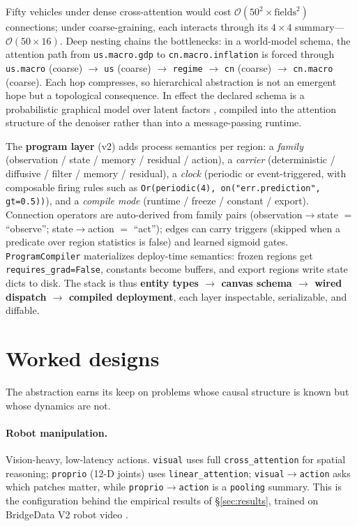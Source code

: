 \documentclass[10pt,twocolumn]{article}
\newcommand{\code}[1]{\texttt{\small #1}}
\begin{document}
Fifty vehicles under dense cross-attention would cost $\mathcal{O}(50^2\!\times\!\text{fields}^2)$ connections; under coarse-graining, each interacts through its $4\times4$ summary---$\mathcal{O}(50\times16)$. Deep nesting chains the bottlenecks: in a world-model schema, the attention path from \code{us.macro.gdp} to \code{cn.macro.inflation} is forced through \code{us.macro} (coarse) $\rightarrow$ \code{us} (coarse) $\rightarrow$ \code{regime} $\rightarrow$ \code{cn} (coarse) $\rightarrow$ \code{cn.macro} (coarse). Each hop compresses, so hierarchical abstraction is not an emergent hope but a topological consequence. In effect the declared schema is a probabilistic graphical model over latent factors \cite{koller2009pgm,pearl2009causality}, compiled into the attention structure of the denoiser rather than into a message-passing runtime.

The \textbf{program layer} (v2) adds process semantics per region: a \emph{family} (observation / state / memory / residual / action), a \emph{carrier} (deterministic / diffusive / filter / memory / residual), a \emph{clock} (periodic or event-triggered, with composable firing rules such as \code{Or(periodic(4), on("err.prediction", gt=0.5))}), and a \emph{compile mode} (runtime / freeze / constant / export). Connection operators are auto-derived from family pairs (observation$\rightarrow$state $=$ ``observe''; state$\rightarrow$action $=$ ``act''); edges can carry triggers (skipped when a predicate over region statistics is false) and learned sigmoid gates. \code{ProgramCompiler} materializes deploy-time semantics: frozen regions get \code{requires\_grad=False}, constants become buffers, and export regions write state dicts to disk. The stack is thus \textbf{entity types $\rightarrow$ canvas schema $\rightarrow$ wired dispatch $\rightarrow$ compiled deployment}, each layer inspectable, serializable, and diffable.

\section{Worked designs}
\label{sec:worked}

The abstraction earns its keep on problems whose causal structure is known but whose dynamics are not.

\paragraph{Robot manipulation.}
Vision-heavy, low-latency actions. \code{visual} uses full \code{cross\_attention} for spatial reasoning; \code{proprio} (12-D joints) uses \code{linear\_attention}; \code{visual}$\rightarrow$\code{action} asks which patches matter, while \code{proprio}$\rightarrow$\code{action} is a \code{pooling} summary. This is the configuration behind the empirical results of \S\ref{sec:results}, trained on BridgeData V2 robot video \cite{walke2023bridgev2}.
\end{document}

